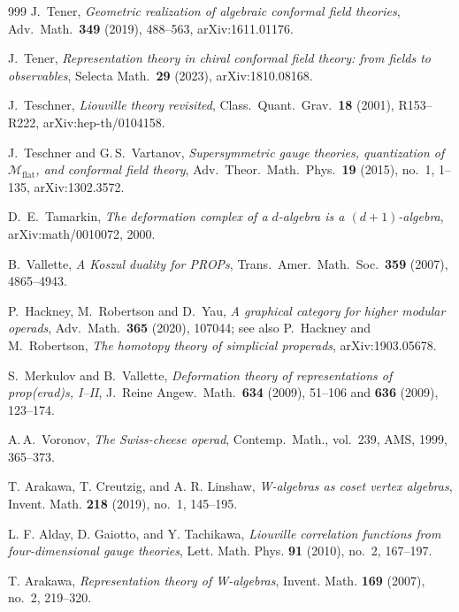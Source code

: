 \documentclass[11pt]{memoir}
\begin{document}
\begin{thebibliography}{999}
 J.~Tener, \emph{Geometric realization of algebraic conformal field theories}, Adv.\ Math.\ \textbf{349} (2019), 488--563, arXiv:1611.01176.

 J.~Tener, \emph{Representation theory in chiral conformal field theory: from fields to observables}, Selecta Math.\ \textbf{29} (2023), arXiv:1810.08168.

 J.~Teschner, \emph{Liouville theory revisited}, Class.\ Quant.\ Grav.\ \textbf{18} (2001), R153--R222, arXiv:hep-th/0104158.

 J.~Teschner and G.\,S.~Vartanov, \emph{Supersymmetric gauge theories, quantization of $\mathcal{M}_{\mathrm{flat}}$, and conformal field theory}, Adv.\ Theor.\ Math.\ Phys.\ \textbf{19} (2015), no.~1, 1--135, arXiv:1302.3572.

 D.~E.~Tamarkin, \emph{The deformation complex of a $d$-algebra is a $(d+1)$-algebra}, arXiv:math/0010072, 2000.

 B.~Vallette, \emph{A Koszul duality for PROPs}, Trans.\ Amer.\ Math.\ Soc.\ \textbf{359} (2007), 4865--4943.

 P.~Hackney, M.~Robertson and D.~Yau, \emph{A graphical category for higher modular operads}, Adv.\ Math.\ \textbf{365} (2020), 107044; see also P.~Hackney and M.~Robertson, \emph{The homotopy theory of simplicial properads}, arXiv:1903.05678.

 S.~Merkulov and B.~Vallette, \emph{Deformation theory of representations of prop(erad)s, I--II}, J.~Reine Angew.~Math.\ \textbf{634} (2009), 51--106 and \textbf{636} (2009), 123--174.

 A.\,A.~Voronov, \emph{The Swiss-cheese operad}, Contemp.\ Math., vol.~239, AMS, 1999, 365--373.



T. Arakawa, T. Creutzig, and A. R. Linshaw, \emph{W-algebras as coset vertex algebras}, Invent. Math. \textbf{218} (2019), no.~1, 145--195.

L. F. Alday, D. Gaiotto, and Y. Tachikawa, \emph{Liouville correlation functions from four-dimensional gauge theories}, Lett. Math. Phys. \textbf{91} (2010), no.~2, 167--197.

T. Arakawa, \emph{Representation theory of W-algebras}, Invent. Math. \textbf{169} (2007), no.~2, 219--320.


\end{thebibliography}
\end{document}
